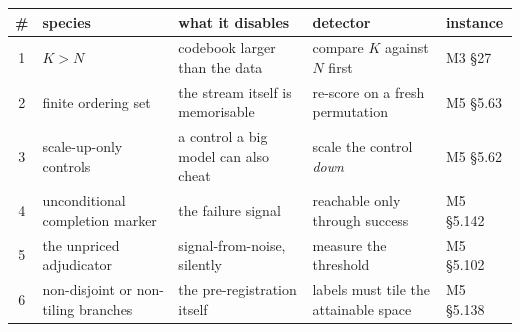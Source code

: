 \footnotesize
\begin{tabular}{@{}c p{2.9cm} p{3.3cm} p{4.2cm} p{1.9cm}@{}}
\toprule
\# & species & what it disables & detector & instance \\
\midrule
1 & $K > N$ & codebook larger than the data & compare $K$ against $N$ first & M3 \S27 \\
2 & finite ordering set & the stream itself is memorisable & re-score on a fresh permutation & M5 \S5.63 \\
3 & scale-up-only controls & a control a big model can also cheat & scale the control \emph{down} & M5 \S5.62 \\
4 & unconditional completion marker & the failure signal & reachable only through success & M5 \S5.142 \\
5 & the unpriced adjudicator & signal-from-noise, silently & measure the threshold & M5 \S5.102 \\
6 & non-disjoint or non-tiling branches & the pre-registration itself & labels must tile the attainable space & M5 \S5.138 \\
\bottomrule
\end{tabular}
